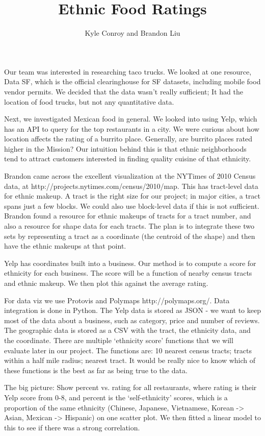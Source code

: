 \documentclass[12pt,letterpaper]{report}
\author{Kyle Conroy and Brandon Liu}
\title{Ethnic Food Ratings}
\begin{document}
\maketitle
\doublespacing

Our team was interested in researching taco trucks. We looked at one resource, Data SF, which is the official clearinghouse for SF datasets, including mobile food vendor permits. We decided that the data wasn’t really sufficient; It had the location of food trucks, but not any quantitative data.

Next, we investigated Mexican food in general. We looked into using Yelp, which has an API to query for the top restaurants in a city. We were curious about how location affects the rating of a burrito place. Generally, are burrito places rated higher in the Mission? Our intuition behind this is that ethnic neighborhoods tend to attract customers interested in finding quality cuisine of that ethnicity.

Brandon came across the excellent visualization at the NYTimes of 2010 Census data, at http://projects.nytimes.com/census/2010/map. This has tract-level data for ethnic makeup. A tract is the right size for our project; in major cities, a tract spans just a few blocks. We could also use block-level data if this is not sufficient. Brandon found a resource for ethnic makeups of tracts for a tract number, and also a resource for shape data for each tracts. The plan is to integrate these two sets by representing a tract as a coordinate (the centroid of the shape) and then have the ethnic makeups at that point.

Yelp has coordinates built into a business. Our method is to compute a score for ethnicity for each business. The score will be a function of nearby census tracts and ethnic makeup. We then plot this against the average rating.

For data viz we use Protovis and Polymaps http://polymaps.org/. Data integration is done in Python. The Yelp data is stored as JSON - we want to keep most of the data about a business, such as category, price and number of reviews. The geographic data is stored as a CSV with the tract, the ethnicity data, and the coordinate. There are multiple ‘ethnicity score’ functions that we will evaluate later in our project. The functions are: 10 nearest census tracts; tracts within a half mile radius; nearest tract. It would be really nice to know which of these functions is the best as far as being true to the data.


The big picture: Show percent vs. rating for all restaurants, where rating is their Yelp score from 0-8, and percent is the ‘self-ethnicity’ scores, which is a proportion of the same ethnicity (Chinese, Japanese, Vietnamese, Korean -> Asian, Mexican -> Hispanic) on one scatter plot. We then fitted a linear model to this to see if there was a strong correlation.
\end{document}
